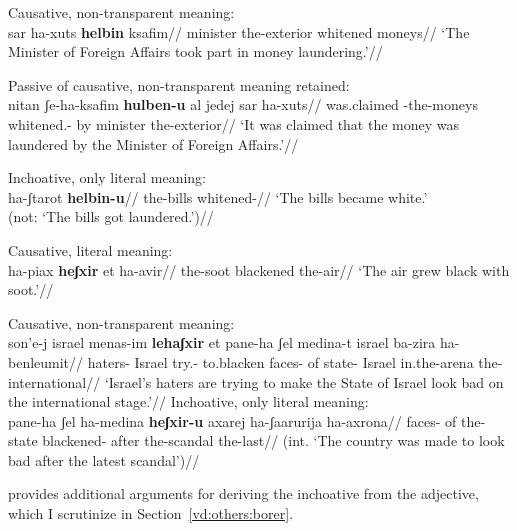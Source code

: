 	\a Causative, non-transparent meaning:\\
		\begingl
			\gla sar ha-xuts \textbf{helbin} ksafim//
			\glb minister the-exterior whitened moneys//
			\glft `The Minister of Foreign Affairs took part in money laundering.'//
		\endgl
	
	\a Passive of causative, non-transparent meaning retained:\\
		\begingl
			\gla nitan ʃe-ha-ksafim \textbf{hulben-u} {al jedej} sar ha-xuts//
			\glb was.claimed -the-moneys whitened.- by minister the-exterior//
			\glft `It was claimed that the money was laundered by the Minister of Foreign Affairs.'//
		\endgl
	
	\a Inchoative, only literal meaning:\\
		\begingl
			\gla ha-ʃtarot \textbf{helbin-u}//
			\glb the-bills whitened-//
			\glft `The bills became white.'\\
				(not: `The bills got laundered.')//
		\endgl
\xe

\pex
	\a Causative, literal meaning:\\
		\begingl
			\gla ha-piax \textbf{heʃxir} et ha-avir//
			\glb the-soot blackened  the-air//
			\glft `The air grew black with soot.'//
		\endgl
	
	\a Causative, non-transparent meaning:\\
		\begingl
			\gla son'e-j israel menas-im \textbf{lehaʃxir} et pane-ha ʃel medina-t israel ba-zira ha-benleumit//
			\glb haters- Israel try.- to.blacken  faces- of state- Israel in.the-arena the-international//
			\glft `Israel's haters are trying to make the State of Israel look bad on the international stage.'//
		\endgl
	\a Inchoative, only literal meaning:\\
		\begingl
			\gla{}pane-ha ʃel ha-medina \textbf{heʃxir-u} axarej ha-ʃaarurija ha-axrona//
			\glb faces- of the-state blackened- after the-scandal the-last//
			\glft (int. `The country was made to look bad after the latest scandal')//
		\endgl
\xe


\cite{borer91} provides additional arguments for deriving the inchoative from the adjective, which I scrutinize in Section~\ref{vd:others:borer}.

